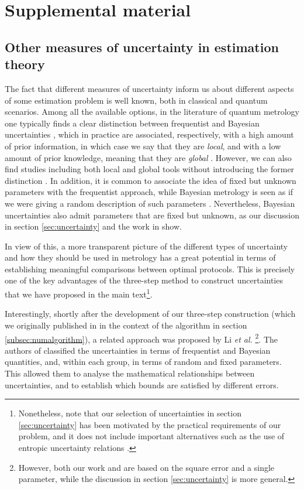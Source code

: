 \chapter{Supplemental material}
\label{app:supplemental}

\section{Other measures of uncertainty in estimation theory}
\label{sec:otheruncertainty}

The fact that different measures of uncertainty inform us about different aspects of some estimation problem is well known, both in classical \citep{jaynes2003} and quantum \cite{iwo1993} scenarios. Among all the available options, in the literature of quantum metrology one typically finds a clear distinction between frequentist and Bayesian uncertainties \cite{rafal2015, li2018}, which in practice are associated, respectively, with a high amount of prior information, in which case we say that they are \emph{local}, and with a low amount of prior knowledge, meaning that they are \emph{global} \cite{paris2009, haase2018jul}. However, we can also find studies including both local and global tools without introducing the former distinction \cite{hall2012}. In addition, it is common to associate the idea of fixed but unknown parameters with the frequentist approach, while Bayesian metrology is seen as if we were giving a random description of such parameters \cite{rafal2015}. Nevertheless, Bayesian uncertainties also admit parameters that are fixed but unknown, as our discussion in section \ref{sec:uncertainty} and the work in \cite{li2018} show.   

In view of this, a more transparent picture of the different types of uncertainty and how they should be used in metrology has a great potential in terms of establishing meaningful comparisons between optimal protocols. This is precisely one of the key advantages of the three-step method to construct uncertainties that we have proposed in the main text\footnote{Nonetheless, note that our selection of uncertainties in section \ref{sec:uncertainty} has been motivated by the practical requirements of our problem, and it does not include important alternatives such as the use of entropic uncertainty relations \cite{jizba2016, jizba2017, hall2018}.}. 

Interestingly, shortly after the development of our three-step construction (which we originally published in \cite{jesus2017} in the context of the algorithm in section \ref{subsec:numalgorithm}), a related approach was proposed by Li \emph{et al.} \cite{li2018}\footnote{However, both our work \cite{jesus2017} and \cite{li2018} are based on the square error and a single parameter, while the discussion in section \ref{sec:uncertainty} is more general.}. The authors of \cite{li2018} classified the uncertainties in terms of frequentist and Bayesian quantities, and, within each group, in terms of random and fixed parameters. This allowed them to analyse the mathematical relationships between uncertainties, and to establish which bounds are satisfied by different errors. 

